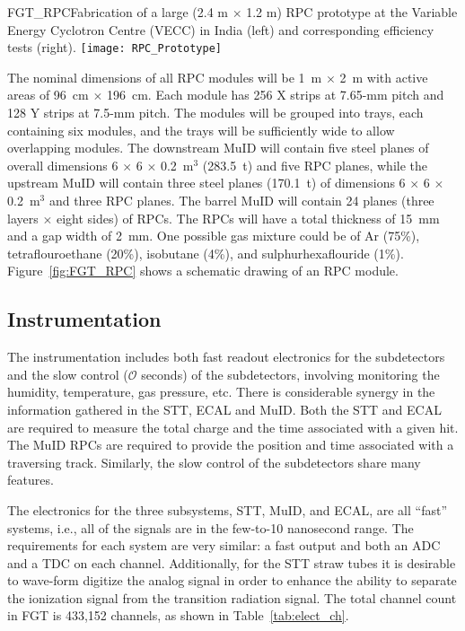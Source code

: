 \begin{cdrfigure}{FGT_RPC}{Fabrication of a large (2.4 m $\times$ 1.2 m) RPC prototype at 
the Variable Energy Cyclotron Centre (VECC) in India (left) and corresponding efficiency tests (right).}
\texttt{[image: RPC\_Prototype]} %
\end{cdrfigure}

The nominal dimensions of all RPC modules will be 1~m $\times$ 2~m with
active areas of 96~cm $\times$ 196~cm. Each
module has 256 X strips
at 7.65-mm pitch and 128 Y strips at 7.5-mm pitch. The modules
will be grouped into trays, each containing six modules, and the trays will
be sufficiently wide to allow overlapping modules. 
The downstream MuID will contain five steel planes of 
overall dimensions
6 $\times$ 6 $\times$ 0.2~m$^3$ (283.5~t)
and five RPC planes, while the upstream MuID will contain three steel
planes (170.1~t) of dimensions 6 $\times$ 6 $\times$ 0.2~m$^3$ and three RPC planes. The barrel MuID will contain
24 planes (three layers $\times$ eight sides) of RPCs. The RPCs will have a total thickness 
of 15~mm and a gap width of 2~mm. One possible gas mixture could be %
of Ar (75\%), tetraflouroethane (20\%), isobutane (4\%),
and sulphurhexaflouride (1\%). 
Figure~\ref{fig:FGT_RPC} shows a schematic drawing of an RPC module. 



\subsection{Instrumentation}
\label{cdrsec:detectors-nd-ref-fgt-instrum}

The instrumentation includes both fast readout electronics for the subdetectors
and the slow control ($\mathcal{O}$ seconds) of the subdetectors, involving monitoring the humidity, 
temperature, gas pressure, etc.
There is considerable synergy in the information gathered in the STT, ECAL and MuID. 
Both the STT and ECAL are required to measure the total charge and the time associated with a 
given hit. The MuID RPCs are required to provide the position and time associated with 
a traversing track. Similarly, the slow control of the subdetectors
share many features.

The electronics for the three subsystems, STT, MuID, and ECAL, are all ``fast'' systems, 
i.e., all of the signals are in the few-to-10 nanosecond range. 
The requirements for each system are very similar: a fast output and both an ADC  
and a TDC on each channel.  Additionally, for the STT straw tubes it 
is desirable to wave-form digitize the analog signal in order to enhance the ability to separate 
the ionization signal from the transition radiation signal. 
The total channel count in FGT is 433,152 channels, as shown in Table~\ref{tab:elect_ch}.  

